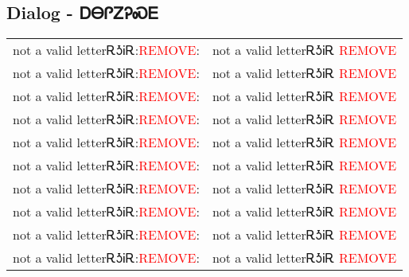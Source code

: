 \newpage\subsection{Dialog - ᎠᎾᎵᏃᎮᏍᎬ}
\begin{tabular}{p{2cm} p{11cm}}
not a valid letterᎡᎼᎥᎡ:\newline \textcolor{red}{REMOVE}: & not a valid letterᎡᎼᎥᎡ 
\newline\textcolor{red}{REMOVE}\\
not a valid letterᎡᎼᎥᎡ:\newline \textcolor{red}{REMOVE}: & not a valid letterᎡᎼᎥᎡ 
\newline\textcolor{red}{REMOVE}\\
not a valid letterᎡᎼᎥᎡ:\newline \textcolor{red}{REMOVE}: & not a valid letterᎡᎼᎥᎡ 
\newline\textcolor{red}{REMOVE}\\
not a valid letterᎡᎼᎥᎡ:\newline \textcolor{red}{REMOVE}: & not a valid letterᎡᎼᎥᎡ 
\newline\textcolor{red}{REMOVE}\\
not a valid letterᎡᎼᎥᎡ:\newline \textcolor{red}{REMOVE}: & not a valid letterᎡᎼᎥᎡ 
\newline\textcolor{red}{REMOVE}\\
not a valid letterᎡᎼᎥᎡ:\newline \textcolor{red}{REMOVE}: & not a valid letterᎡᎼᎥᎡ 
\newline\textcolor{red}{REMOVE}\\
not a valid letterᎡᎼᎥᎡ:\newline \textcolor{red}{REMOVE}: & not a valid letterᎡᎼᎥᎡ 
\newline\textcolor{red}{REMOVE}\\
not a valid letterᎡᎼᎥᎡ:\newline \textcolor{red}{REMOVE}: & not a valid letterᎡᎼᎥᎡ 
\newline\textcolor{red}{REMOVE}\\
not a valid letterᎡᎼᎥᎡ:\newline \textcolor{red}{REMOVE}: & not a valid letterᎡᎼᎥᎡ 
\newline\textcolor{red}{REMOVE}\\
not a valid letterᎡᎼᎥᎡ:\newline \textcolor{red}{REMOVE}: & not a valid letterᎡᎼᎥᎡ 
\newline\textcolor{red}{REMOVE}\\
\end{tabular}
